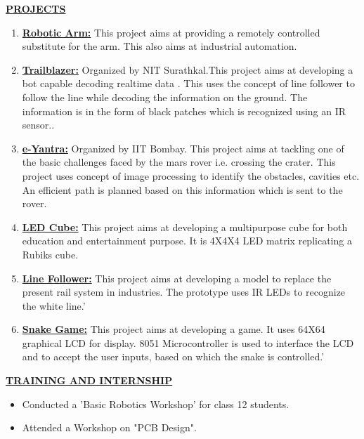 \documentclass[10pt]{article}
\begin{document}
	\vspace{0.5cm}	
	\underline{\textbf{\Large{PROJECTS}}}
	\begin{enumerate}
		\item{\underline{\textbf{\large{Robotic Arm:}}} This project aims at providing a remotely controlled substitute for the arm. This   also aims at industrial automation.}
		\item{\underline{\textbf{\large{Trailblazer:}}} Organized by NIT Surathkal.This project aims at developing a bot capable decoding realtime data . This uses the concept of line follower to follow the line while decoding the information on the ground. The information is in the form of black patches which is recognized using an IR sensor..}
		\item{\underline{\textbf{\large{e-Yantra:}}} Organized by IIT Bombay. This project aims at tackling one of the basic challenges faced by the mars rover i.e. crossing the crater. This project uses concept of image processing to identify the obstacles, cavities etc. An efficient path is planned based on this information which is sent to the rover.}
		\item{\underline{\textbf{\large{LED Cube:}}} This project aims at developing a multipurpose cube for both education and entertainment purpose. It is 4X4X4 LED matrix replicating a Rubiks cube.}
		\item{\underline{\textbf{\large{Line Follower:}}} This project aims at developing a model to replace the present rail system in industries. The prototype uses IR LEDs to recognize the white line.'}
		\item{\underline{\textbf{\large{Snake Game:}}} This project aims at developing a game. It uses 64X64 graphical LCD for display. 8051 Microcontroller is used to interface the LCD and to accept the user inputs, based on which the snake is controlled.'}
	\end{enumerate}
	
	\hfill
	
		\underline{\textbf{\Large{TRAINING AND INTERNSHIP}}}
		\begin{itemize}
			\item{Conducted a 'Basic Robotics Workshop' for class 12 students.}
			\item{Attended a Workshop on "PCB Design".}
		\end{itemize}
		
		\hfill 
		
		
		
\end{document}
